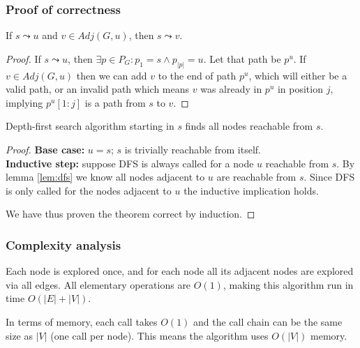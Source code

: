 \subsubsection{Proof of correctness}
\begin{lemma} \label{lem:dfs}
    If $s \leadsto u$ and $v \in Adj(G, u)$, then $s \leadsto v$.
\end{lemma}
\begin{proof}
    If $s \leadsto u$, then $\exists p \in P_G \colon p_1 = s \wedge p_{|p|} = u$. Let that path be $p^u$. If $v \in Adj(G, u)$ then we can add $v$ to the end of path $p^u$, which will either be a valid path, or an invalid path which means $v$ was already in $p^u$ in position $j$, implying $p^u[1:j]$ is a path from $s$ to $v$.
\end{proof}
\begin{theorem}
    Depth-first search algorithm starting in $s$ finds all nodes reachable from $s$.
\end{theorem}
\begin{proof} \textbf{Base case:} $u=s$; $s$ is trivially reachable from itself. \\
\textbf{Inductive step:} suppose \textsc{DFS} is always called for a node $u$ reachable from $s$. By lemma \ref{lem:dfs} we know all nodes adjacent to $u$ are reachable from $s$. Since \textsc{DFS} is only called for the nodes adjacent to $u$ the inductive implication holds.\par
We have thus proven the theorem correct by induction.
\end{proof}
\subsubsection{Complexity analysis}
Each node is explored once, and for each node all its adjacent nodes are explored via all edges. All elementary operations are $O(1)$, making this algorithm run in time $O(|E|+|V|)$.\par
In terms of memory, each call takes $O(1)$ and the call chain can be the same size as $|V|$ (one call per node). This means the algorithm uses $O(|V|)$ memory.
